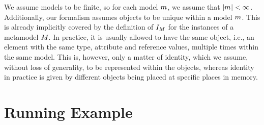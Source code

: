 We assume models to be finite, so for each model $m_{}$, we assume that $|m_{}| < \infty$.
Additionally, our formalism assumes objects to be unique within a model $m_{}$. 
This is already implicitly covered by the definition of $I_{M}$ for the instances of a metamodel $M_{}$. 
In practice, it is usually allowed to have the same object, i.e., an element with the same type, attribute and reference values, multiple times within the same model. 
This is, however, only a matter of identity, which we assume, without loss of generality, to be represented within the objects, whereas identity in practice is given by different objects being placed at specific places in memory.





\section{Running Example}

